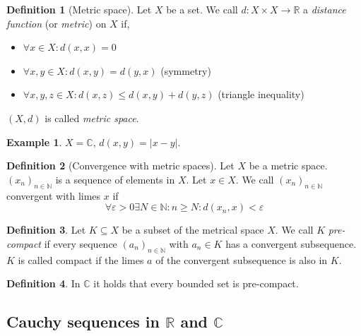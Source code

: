 \documentclass[a4paper,landscape,twocolumn]{article}
\theoremstyle{definition}
\newtheorem{defi}{Definition}
\newtheorem{ex}{Example}
\newcommand\abs[1]{\left|#1\right|}
\newcommand\seq[1]{{\left(#1\right)}_{n \in \mathbb N}}
\begin{document}
\begin{defi}[Metric space]
  Let $X$ be a set. We call $d: X \times X \to \mathbb R$ a \emph{distance function} (or \emph{metric}) on $X$ if,
  \begin{itemize}
    \item $\forall x \in X: d(x, x) = 0$
    \item $\forall x,y \in X: d(x, y) = d(y, x)$ (symmetry)
    \item $\forall x,y,z \in X: d(x,z) \leq d(x,y) + d(y,z)$ (triangle inequality)
  \end{itemize}
  $(X, d)$ is called \emph{metric space}.
\end{defi}
\begin{ex}
  $X = \mathbb C$, $d(x, y) = \abs{x - y}$.
\end{ex}

\begin{defi}[Convergence with metric spaces]
  Let $X$ be a metric space. $(x_n)_{n \in \mathbb N}$ is a sequence of elements in $X$.
  Let $x \in X$. We call $\seq{x_n}$ convergent with limes $x$ if
  \[ \forall \varepsilon > 0 \exists N \in \mathbb N: n \geq N: d(x_n, x) < \varepsilon \]
\end{defi}


\begin{defi}
  Let $K \subseteq X$ be a subset of the metrical space $X$. We call $K$ \emph{pre-compact}
  if every sequence $\seq{a_n}$ with $a_n \in K$ has a convergent subsequence.
  $K$ is called compact if the limes $a$ of the convergent subsequence is also in $K$.
\end{defi}

\begin{defi}
  In $\mathbb C$ it holds that every bounded set is pre-compact.
\end{defi}

\subsection{Cauchy sequences in $\mathbb R$ and $\mathbb C$}
%
\end{document}
